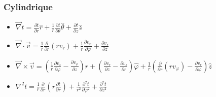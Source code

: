 \documentclass[../main.tex]{subfiles}
\begin{document}
\subsubsection{Cylindrique}
\begin{itemize}
    \item $\Vec{\nabla} t = \frac{\partial t}{\partial r} \hat{r} + \frac{1}{r} \frac{\partial t}{\partial \theta} \hat{\theta} + \frac{\partial t}{\partial z} \hat{z}$\\
    \item $\Vec{\nabla} \cdot \Vec{v} = \frac{1}{r} \frac{\partial}{\partial r}(r v_r) + \frac{1}{r} \frac{\partial v_\varphi}{\partial \varphi} + \frac{\partial v_z}{\partial z}$\\
    \item $\Vec{\nabla} \times \Vec{v} = (\frac{1}{r} \frac{\partial v_z}{\partial \varphi} - \frac{\partial v_\varphi}{\partial z}) \hat{r} + (\frac{\partial v_r}{\partial z} - \frac{\partial v_z}{\partial r}) \hat{\varphi} + \frac{1}{r}(\frac{\partial}{\partial r} (r v_\varphi) - \frac{\partial v_r}{\partial \varphi})\hat{z}$\\
    \item $\nabla^2 t = \frac{1}{r} \frac{\partial}{\partial r}(r \frac{\partial t}{\partial r}) + \frac{1}{r^2} \frac{\partial^2 t}{\partial \varphi^2} + \frac{\partial^2 t}{\partial z^2}$\\
\end{itemize}
\end{document}
